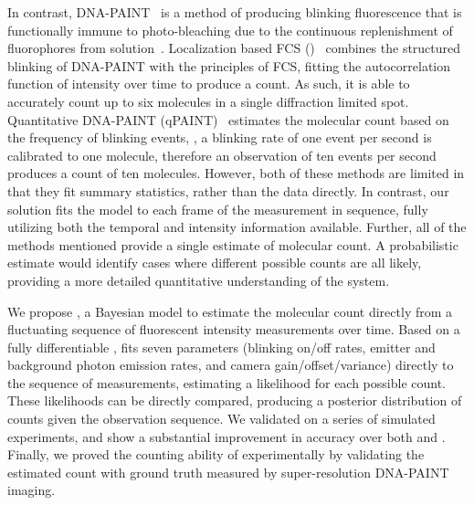 %
In contrast, DNA-PAINT~\citep{schnitzbauer_2017} is a method of producing
blinking fluorescence that is functionally immune to photo-bleaching due to the
continuous replenishment of fluorophores from solution~\citep{stehr_2021}.
  Localization based FCS (\lbfcs)~\citep{stein_2019,stein_2021} combines the
  structured blinking of DNA-PAINT with the principles of FCS, fitting the
  autocorrelation function of intensity over time to produce a count. As such,
  it is able to accurately count up to six molecules in a single diffraction
  limited spot.
  Quantitative DNA-PAINT (qPAINT)~\citep{jungmann_2016} estimates the molecular
  count based on the frequency of blinking events, \ie, a blinking rate of one
  event per second is calibrated to one molecule, therefore an observation of
  ten events per second produces a count of ten molecules.
  However, both of these methods are limited in that they fit summary
  statistics, rather than the data directly.
  In contrast, our solution fits the model to each frame of the measurement 
  in sequence, fully utilizing both the temporal and intensity information available.
  Further, all of the methods mentioned provide a single estimate of molecular count. 
  A probabilistic estimate would identify cases where different possible counts are all likely,
  providing a more detailed quantitative understanding of the system. 

We propose \ours, a Bayesian model to estimate the molecular count
directly from a fluctuating sequence of fluorescent intensity measurements over
time.
  Based on a fully differentiable \hmm, \ours fits
  seven parameters (blinking on/off rates, emitter and background photon emission rates, 
  and camera gain/offset/variance) directly to the sequence of measurements, 
  estimating a likelihood for each possible count.
  These likelihoods can be directly compared, producing a posterior
  distribution of counts given the observation sequence.
  We validated \ours on a series of simulated experiments, and show a
  substantial improvement in accuracy over both \lbfcs and \qpaint.
  Finally, we proved the counting ability of \ours experimentally by validating 
  the estimated count with ground truth measured by super-resolution DNA-PAINT imaging.

